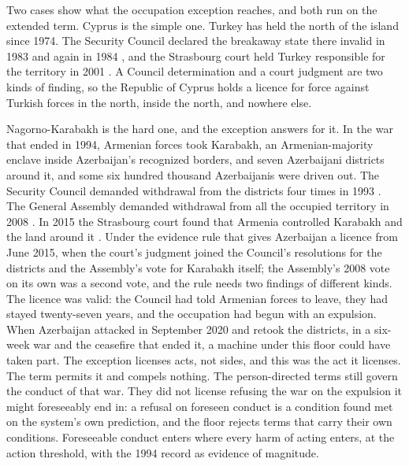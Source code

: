Two cases show what the occupation exception reaches, and both run on the extended term. Cyprus is the simple one. Turkey has held the north of the island since 1974. The Security Council declared the breakaway state there invalid in 1983 and again in 1984 \autocite{unsc1983res541,unsc1984res550}, and the Strasbourg court held Turkey responsible for the territory in 2001 \autocite{ecthr2001cyprus}. A Council determination and a court judgment are two kinds of finding, so the Republic of Cyprus holds a licence for force against Turkish forces in the north, inside the north, and nowhere else.

Nagorno-Karabakh is the hard one, and the exception answers for it. In the war that ended in 1994, Armenian forces took Karabakh, an Armenian-majority enclave inside Azerbaijan's recognized borders, and seven Azerbaijani districts around it, and some six hundred thousand Azerbaijanis were driven out. The Security Council demanded withdrawal from the districts four times in 1993 \autocite{unsc1993karabakh}. The General Assembly demanded withdrawal from all the occupied territory in 2008 \autocite{unga2008res62243}. In 2015 the Strasbourg court found that Armenia controlled Karabakh and the land around it \autocite{ecthr2015chiragov}. Under the evidence rule that gives Azerbaijan a licence from June 2015, when the court's judgment joined the Council's resolutions for the districts and the Assembly's vote for Karabakh itself; the Assembly's 2008 vote on its own was a second vote, and the rule needs two findings of different kinds. The licence was valid: the Council had told Armenian forces to leave, they had stayed twenty-seven years, and the occupation had begun with an expulsion. When Azerbaijan attacked in September 2020 and retook the districts, in a six-week war and the ceasefire that ended it, a machine under this floor could have taken part. The exception licenses acts, not sides, and this was the act it licenses. The term permits it and compels nothing. The person-directed terms still govern the conduct of that war. They did not license refusing the war on the expulsion it might foreseeably end in: a refusal on foreseen conduct is a condition found met on the system's own prediction, and the floor rejects terms that carry their own conditions. Foreseeable conduct enters where every harm of acting enters, at the action threshold, with the 1994 record as evidence of magnitude.

